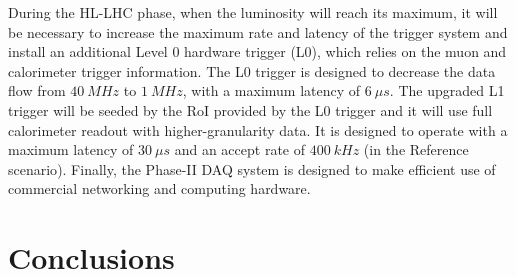 \documentclass[a4paper,twoside,12pt]{article}
\begin{document}
During the HL-LHC phase, when the luminosity will reach its maximum, it will be necessary
to increase the maximum rate and latency of the trigger system and install an additional Level 0 hardware trigger (L0), which relies on the muon and calorimeter trigger information. The L0 trigger is designed to decrease the data flow from $40\ MHz$ to $1\ MHz$, with a maximum latency of $6\ \mu s$. The upgraded L1 trigger will be seeded by the RoI provided by the L0
trigger and it will use full calorimeter readout with higher-granularity data. It is designed to
operate with a maximum latency of $30\ \mu s$ and an accept rate of $400\ kHz$ (in the Reference scenario\cite{scoping}). Finally, the Phase-II DAQ system is designed to make 
efficient use of commercial networking and computing hardware. 







\newpage
\section{Conclusions}\label{sec:conclusions}
\baselineskip 25pt
\baselineskip 5pt
\baselineskip 16pt

\appendix




\end{document}
